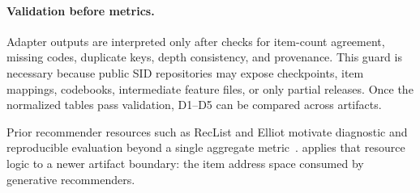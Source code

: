 \paragraph{Validation before metrics.}
Adapter outputs are interpreted only after checks for item-count agreement,
missing codes, duplicate keys, depth consistency, and provenance. This guard is
necessary because public SID repositories may expose checkpoints, item mappings,
codebooks, intermediate feature files, or only partial releases. Once the
normalized tables pass validation, D1--D5 can be compared across artifacts.

Prior recommender resources such as RecList and Elliot motivate diagnostic and
reproducible evaluation beyond a single aggregate metric~\cite{chia2022reclist,anelli2021elliot}.
\tool applies that resource logic to a newer artifact boundary: the item
address space consumed by generative recommenders.
